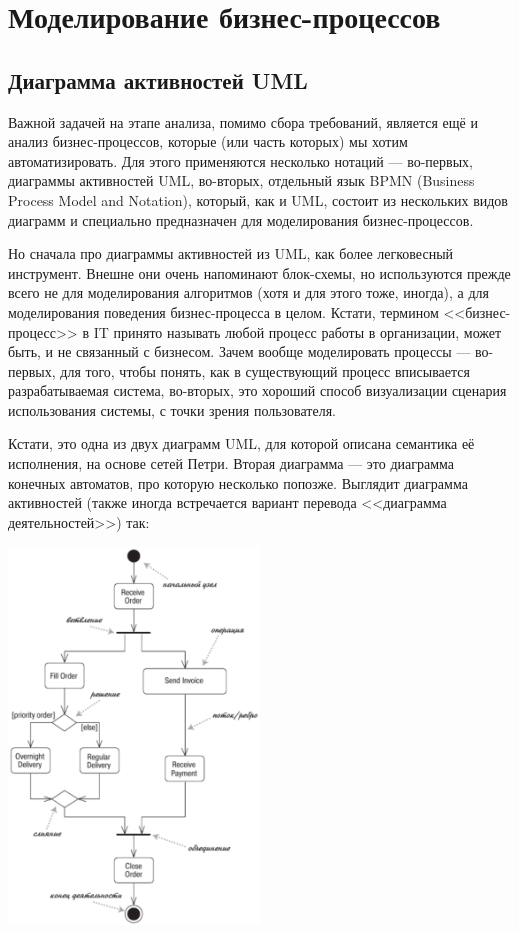 \documentclass{../../text-style}
\begin{document}
\section{Моделирование бизнес-процессов}

\subsection{Диаграмма активностей UML}

Важной задачей на этапе анализа, помимо сбора требований, является ещё и анализ бизнес-процессов, которые (или часть которых) мы хотим автоматизировать. Для этого применяются несколько нотаций --- во-первых, диаграммы активностей UML, во-вторых, отдельный язык BPMN (Business Process Model and Notation), который, как и UML, состоит из нескольких видов диаграмм и специально предназначен для моделирования бизнес-процессов.

Но сначала про диаграммы активностей из UML, как более легковесный инструмент. Внешне они очень напоминают блок-схемы, но используются прежде всего не для моделирования алгоритмов (хотя и для этого тоже, иногда), а для моделирования поведения бизнес-процесса в целом. Кстати, термином <<бизнес-процесс>> в IT принято называть любой процесс работы в организации, может быть, и не связанный с бизнесом. Зачем вообще моделировать процессы --- во-первых, для того, чтобы понять, как в существующий процесс вписывается разрабатываемая система, во-вторых, это хороший способ визуализации сценария использования системы, с точки зрения пользователя.

Кстати, это одна из двух диаграмм UML, для которой описана семантика её исполнения, на основе сетей Петри. Вторая диаграмма --- это диаграмма конечных автоматов, про которую несколько попозже. Выглядит диаграмма активностей (также иногда встречается вариант перевода <<диаграмма деятельностей>>) так:

\begin{center}
    \includegraphics[width=0.5\textwidth]{activityDiagram.png}
\end{center}
\end{document}
